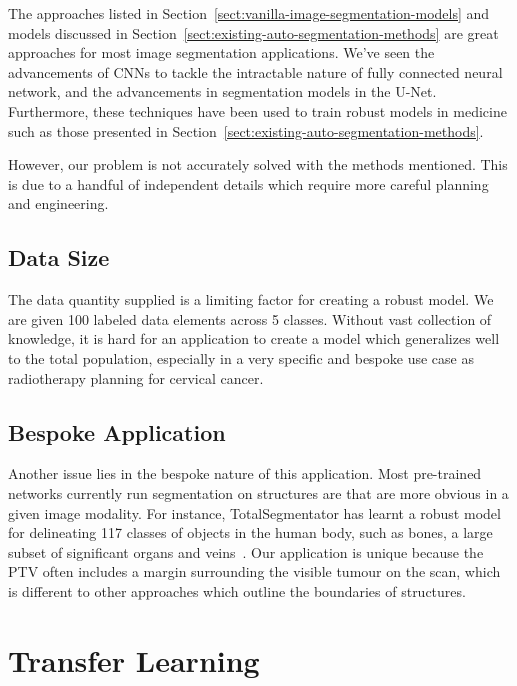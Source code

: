 \documentclass[11pt,twoside]{report}
\begin{document}
The approaches listed in Section~\ref{sect:vanilla-image-segmentation-models} and models discussed in Section~\ref{sect:existing-auto-segmentation-methods} are great approaches for most image segmentation applications. We've seen the advancements of CNNs to tackle the intractable nature of fully connected neural network, and the advancements in segmentation models in the U-Net. Furthermore, these techniques have been used to train robust models in medicine such as those presented in Section~\ref{sect:existing-auto-segmentation-methods}. 

However, our problem is not accurately solved with the methods mentioned. This is due to a handful of independent details which require more careful planning and engineering.

\subsection{Data Size}\label{sect:solving-the-problem-data-size}

The data quantity supplied is a limiting factor for creating a robust model. We are given 100 labeled data elements across 5 classes. Without vast collection of knowledge, it is hard for an application to create a model which generalizes well to the total population, especially in a very specific and bespoke use case as radiotherapy planning for cervical cancer.

\subsection{Bespoke Application}\label{sect:solving-the-problem-bespoke-application}

Another issue lies in the bespoke nature of this application. Most pre-trained networks currently run segmentation on structures are that are more obvious in a given image modality. For instance, TotalSegmentator has learnt a robust model for delineating 117 classes of objects in the human body, such as bones, a large subset of significant organs and veins~\cite{totalsegmentor-git}. Our application is unique because the PTV often includes a margin surrounding the visible tumour on the scan, which is different to other approaches which outline the boundaries of structures.

\section{Transfer Learning}\label{sect:transfer-learning}
\end{document}
